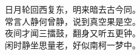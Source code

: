 \begin{WUTacknowledgements}
\par
\begin{center}
    日月轮回西复东，明来暗去古今同。\\
    常言人静何曾静，说到真空果是空。\\
    夜间才闻三擂鼓，翻身又听五更钟。\\
    闲时静坐思量老，好似南柯一梦中。
\end{center}
\end{WUTacknowledgements}
